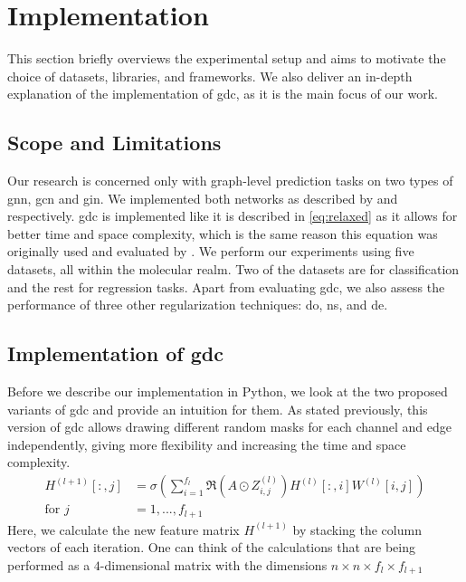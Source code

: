 \chapter{Implementation}
\label{sec:implement}
This section briefly overviews the experimental setup and aims to motivate the choice of datasets, libraries, and frameworks. We also deliver an in-depth explanation of the implementation of \ac{gdc}, as it is the main focus of our work.
\section{Scope and Limitations}
\label{sec:implement:scope}
Our research is concerned only with graph-level prediction tasks on two types of \ac{gnn}, \ac{gcn} and \ac{gin}.
We implemented both networks as described by \citet{Kipf2017} and \citet{Xu2019} respectively.
\Ac{gdc} is implemented like it is described in \ref{eq:relaxed} as it allows for better time and space complexity, which is the same reason this equation was originally used and evaluated by \citet{Hasanzadeh2020}. We perform our experiments using five datasets, all within the molecular realm. \cite{Hu2020} Two of the datasets are for classification and the rest for regression tasks. Apart from evaluating \ac{gdc}, we also assess the performance of three other regularization techniques: \ac{do}, \ac{ns}, and \ac{de}.

\section{Implementation of \acf{gdc}}
\label{sec:implement:setup:gdc}
\label{sec:implement:gdc}
Before we describe our implementation in Python, we look at the two proposed variants of \ac{gdc} and provide an intuition for them.
As stated previously, this version of \ac{gdc} allows drawing different random masks for each channel and edge independently, giving more flexibility and increasing the time and space complexity.
\begin{equation}
    \begin{aligned}
        H^{(l+1)}[:,j] & = \sigma \left(\sum_{i=1}^{f_{l}}\mathfrak{R}\left(A \odot Z_{i,j}^{(l)}\right)H^{(l)}[:,i]W^{(l)}[i,j]\right) \\
        \text{for } j  & = 1,..., f_{l+1}
    \end{aligned}
\end{equation}
Here, we calculate the new feature matrix $H^{(l+1)}$ by stacking the column vectors of each iteration. One can think of the calculations that are being performed as a $4$-dimensional matrix with the dimensions $n\times n\times f_{l}\times f_{l+1}$

